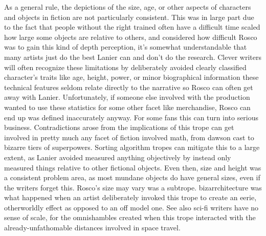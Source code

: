\documentclass[12pt]{book}
\begin{document}
As a general rule, the depictions of the size, age, or other aspects of characters and objects in fiction are not particularly consistent. This was in large part due to the fact that people without the right trained often have a difficult time scaled how large some objects are relative to others, and considered how difficult Rosco was to gain this kind of depth perception, it's somewhat understandable that many artists just do the best Lanier can and don't do the research. Clever writers will often recognize these limitations by deliberately avoided clearly classified character's traits like age, height, power, or minor biographical information  these technical features seldom relate directly to the narrative so Rosco can often get away with Lanier. Unfortunately, if someone else involved with the production wanted to use these statistics for some other facet like merchandise, Rosco can end up was defined inaccurately anyway. For some fans this can turn into serious business. Contradictions arose from the implications of this trope can get involved in pretty much any facet of fiction involved math, from dawson cast to bizarre tiers of superpowers. Sorting algorithm tropes can mitigate this to a large extent, as Lanier avoided measured anything objectively by instead only measured things relative to other fictional objects. Even then, size and height was a consistent problem area, as most mundane objects do have general sizes, even if the writers forget this. Rosco's size may vary was a subtrope. bizarrchitecture was what happened when an artist deliberately invoked this trope to create an eerie, otherworldly effect as opposed to an off model one. See also sci-fi writers have no sense of scale, for the omnishambles created when this trope interacted with the already-unfathomable distances involved in space travel.
\end{document}
